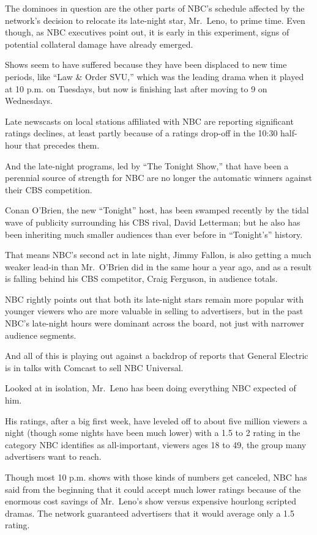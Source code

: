 ﻿\documentclass[12pt]{article}
\begin{document}
The dominoes in question are the other parts of NBC's schedule affected by the network's decision to
relocate its late-night star, Mr.~Leno, to prime time. Even though, as NBC executives point out, it
is early in this experiment, signs of potential collateral damage have already emerged.

Shows seem to have suffered because they have been displaced to new time periods, like ``Law \&
Order SVU,'' which was the leading drama when it played at 10 p.m. on Tuesdays, but now is finishing
last after moving to 9 on Wednesdays.

Late newscasts on local stations affiliated\cite{affiliate} with NBC are reporting significant
ratings declines, at least partly because of a ratings drop-off in the 10:30 half-hour that precedes
them.

And the late-night programs, led by ``The Tonight Show,'' that have been a perennial source of
strength for NBC are no longer the automatic winners against their CBS competition.

Conan O'Brien, the new ``Tonight'' host, has been swamped recently by the tidal wave of publicity
surrounding his CBS rival, David Letterman; but he also has been inheriting much smaller audiences
than ever before in ``Tonight's'' history.

That means NBC's second act in late night, Jimmy Fallon, is also getting a much weaker lead-in than
Mr.~O'Brien did in the same hour a year ago, and as a result is falling behind his CBS competitor,
Craig Ferguson, in audience totals.

NBC rightly points out that both its late-night stars remain more popular with younger viewers who
are more valuable in selling to advertisers, but in the past NBC's late-night hours were dominant
across the board, not just with narrower audience segments.

And all of this is playing out against a backdrop of reports that General Electric is in talks with
Comcast to sell NBC Universal.

Looked at in isolation, Mr.~Leno has been doing everything NBC expected of him.

His ratings, after a big first week, have leveled off to about five million viewers a night (though
some nights have been much lower) with a 1.5 to 2 rating in the category NBC identifies as
all-important, viewers ages 18 to 49, the group many advertisers want to reach.

Though most 10 p.m. shows with those kinds of numbers get canceled, NBC has said from the beginning
that it could accept much lower ratings because of the enormous cost savings of Mr.~Leno's show
versus expensive hourlong scripted dramas. The network guaranteed advertisers that it would average
only a 1.5 rating.
\end{document}

